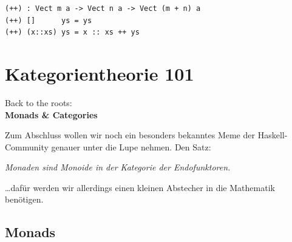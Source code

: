 \documentclass{beamer}
\begin{document}
\begin{frame}[fragile]

\begin{verbatim}
\end{verbatim}

\begin{verbatim}
(++) : Vect m a -> Vect n a -> Vect (m + n) a
(++) []      ys = ys
(++) (x::xs) ys = x :: xs ++ ys
\end{verbatim}

\end{frame}

\section*{Kategorientheorie 101}

\begin{frame}

\begin{center}
Back to the roots:\\
\Large \textbf{Monads \& Categories}
\end{center}

\end{frame}


\begin{frame}
Zum Abschluss wollen wir noch ein besonders bekanntes Meme der Haskell-Community genauer
unter die Lupe nehmen. Den Satz:

\begin{center}
\textit{\glqq Monaden sind Monoide in der Kategorie der Endofunktoren.\grqq}
\end{center}
\pause

\dots dafür werden wir allerdings einen kleinen Abstecher in die Mathematik benötigen.
\end{frame}

\subsection*{Monads}
\end{document}
